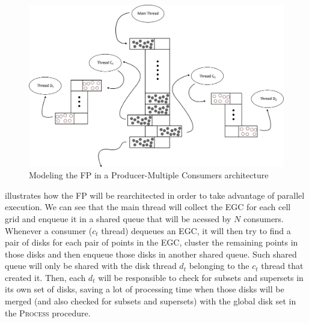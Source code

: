 \begin{figure}[h!]
    \centering
    \includegraphics[width=\linewidth]{images/multithread.png}
    \caption{Modeling the FP in a Producer-Multiple Consumers architecture}
    \label{fig:multithread}
\end{figure}

 illustrates how the FP will be rearchitected in order to take advantage of parallel execution.
We can see that the main thread will collect the EGC for each cell grid and enqueue it in a shared queue that will be
acessed by $N$ consumers. Whenever a consumer ($c_t$ thread) dequeues an EGC, it will then try to find a pair of disks
for each pair of points in the EGC, cluster the remaining points in those disks and then enqueue those disks in another
shared queue. Such shared queue will only be shared with the disk thread $d_t$ belonging to the $c_t$ thread that
created it. Then, each $d_t$ will be responsible to check for subsets and supersets in its own set of disks, saving a
lot of processing time when those disks will be merged (and also checked for subsets and supersets) with the global disk
set in the \textsc{Process} procedure.
